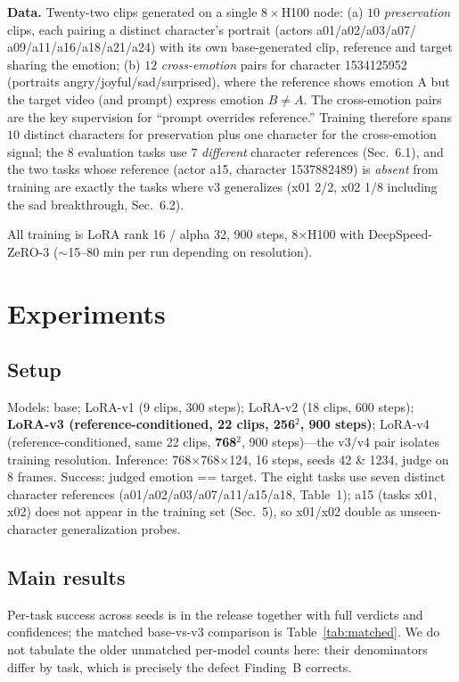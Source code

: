\documentclass{article}
\begin{document}
\textbf{Data.} Twenty-two clips generated on a single $8\times$H100 node: (a) $10$
\emph{preservation} clips, each pairing a distinct character's portrait (actors a01/a02/a03/a07/
a09/a11/a16/a18/a21/a24) with its own base-generated clip, reference and target sharing the emotion;
(b) $12$ \emph{cross-emotion} pairs for character 1534125952 (portraits angry/joyful/sad/surprised),
where the reference shows emotion A but the target video (and prompt) express emotion $B\neq A$. The
cross-emotion pairs are the key supervision for ``prompt overrides reference.'' Training therefore
spans $10$ distinct characters for preservation plus one character for the cross-emotion signal; the
$8$ evaluation tasks use $7$ \emph{different} character references (Sec.~6.1), and the two tasks
whose reference (actor a15, character 1537882489) is \emph{absent} from training are exactly the
tasks where v3 generalizes (x01 2/2, x02 1/8 including the sad breakthrough, Sec.~6.2).

All training is LoRA rank 16 / alpha 32, 900 steps, 8$\times$H100 with DeepSpeed-ZeRO-3
($\sim$15--80 min per run depending on resolution).

\section{Experiments}
\subsection{Setup}
Models: base; LoRA-v1 (9 clips, 300 steps); LoRA-v2 (18 clips, 600 steps); \textbf{LoRA-v3
(reference-conditioned, 22 clips, 256$^2$, 900 steps)}; LoRA-v4 (reference-conditioned, same 22
clips, \textbf{768$^2$}, 900 steps)---the v3/v4 pair isolates training resolution. Inference:
768$\times$768$\times$124, 16 steps, seeds 42 \& 1234, judge on 8 frames. Success: judged emotion
== target. The eight tasks use seven distinct character references (a01/a02/a03/a07/a11/a15/a18,
Table~1); a15 (tasks x01, x02) does not appear in the training set (Sec.~5), so x01/x02 double as
unseen-character generalization probes.

\subsection{Main results}
Per-task success across seeds is in the release together with full verdicts and confidences; the
matched base-vs-v3 comparison is Table~\ref{tab:matched}. We do not tabulate the older unmatched
per-model counts here: their denominators differ by task, which is precisely the defect Finding~B
corrects.
\end{document}
